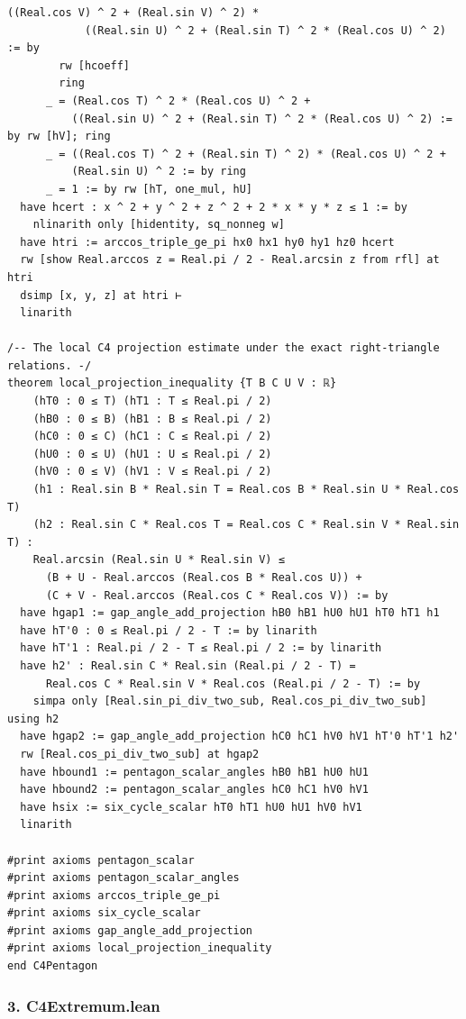 \documentclass[11pt,a4paper]{article}
\begin{document}
\begin{Verbatim}[breaklines,breakanywhere,fontsize=\footnotesize]
          ((Real.cos V) ^ 2 + (Real.sin V) ^ 2) *
            ((Real.sin U) ^ 2 + (Real.sin T) ^ 2 * (Real.cos U) ^ 2) := by
        rw [hcoeff]
        ring
      _ = (Real.cos T) ^ 2 * (Real.cos U) ^ 2 +
          ((Real.sin U) ^ 2 + (Real.sin T) ^ 2 * (Real.cos U) ^ 2) := by rw [hV]; ring
      _ = ((Real.cos T) ^ 2 + (Real.sin T) ^ 2) * (Real.cos U) ^ 2 +
          (Real.sin U) ^ 2 := by ring
      _ = 1 := by rw [hT, one_mul, hU]
  have hcert : x ^ 2 + y ^ 2 + z ^ 2 + 2 * x * y * z ≤ 1 := by
    nlinarith only [hidentity, sq_nonneg w]
  have htri := arccos_triple_ge_pi hx0 hx1 hy0 hy1 hz0 hcert
  rw [show Real.arccos z = Real.pi / 2 - Real.arcsin z from rfl] at htri
  dsimp [x, y, z] at htri ⊢
  linarith

/-- The local C4 projection estimate under the exact right-triangle relations. -/
theorem local_projection_inequality {T B C U V : ℝ}
    (hT0 : 0 ≤ T) (hT1 : T ≤ Real.pi / 2)
    (hB0 : 0 ≤ B) (hB1 : B ≤ Real.pi / 2)
    (hC0 : 0 ≤ C) (hC1 : C ≤ Real.pi / 2)
    (hU0 : 0 ≤ U) (hU1 : U ≤ Real.pi / 2)
    (hV0 : 0 ≤ V) (hV1 : V ≤ Real.pi / 2)
    (h1 : Real.sin B * Real.sin T = Real.cos B * Real.sin U * Real.cos T)
    (h2 : Real.sin C * Real.cos T = Real.cos C * Real.sin V * Real.sin T) :
    Real.arcsin (Real.sin U * Real.sin V) ≤
      (B + U - Real.arccos (Real.cos B * Real.cos U)) +
      (C + V - Real.arccos (Real.cos C * Real.cos V)) := by
  have hgap1 := gap_angle_add_projection hB0 hB1 hU0 hU1 hT0 hT1 h1
  have hT'0 : 0 ≤ Real.pi / 2 - T := by linarith
  have hT'1 : Real.pi / 2 - T ≤ Real.pi / 2 := by linarith
  have h2' : Real.sin C * Real.sin (Real.pi / 2 - T) =
      Real.cos C * Real.sin V * Real.cos (Real.pi / 2 - T) := by
    simpa only [Real.sin_pi_div_two_sub, Real.cos_pi_div_two_sub] using h2
  have hgap2 := gap_angle_add_projection hC0 hC1 hV0 hV1 hT'0 hT'1 h2'
  rw [Real.cos_pi_div_two_sub] at hgap2
  have hbound1 := pentagon_scalar_angles hB0 hB1 hU0 hU1
  have hbound2 := pentagon_scalar_angles hC0 hC1 hV0 hV1
  have hsix := six_cycle_scalar hT0 hT1 hU0 hU1 hV0 hV1
  linarith

#print axioms pentagon_scalar
#print axioms pentagon_scalar_angles
#print axioms arccos_triple_ge_pi
#print axioms six_cycle_scalar
#print axioms gap_angle_add_projection
#print axioms local_projection_inequality
end C4Pentagon
\end{Verbatim}

\subsubsection{3. C4Extremum.lean}\label{c4extremum.lean}
\end{document}
